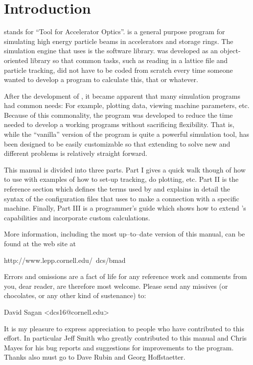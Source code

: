 \section*{Introduction}

\tao stands for ``Tool for Accelerator Optics''. \tao is a general
purpose program for simulating high energy particle beams in
accelerators and storage rings. The simulation engine that \tao uses
is the \bmad software library\cite{b:bmad}. \bmad was developed as an
object-oriented library so that common tasks, such as reading in a
lattice file and particle tracking, did not have to be coded from
scratch every time someone wanted to develop a program to calculate
this, that or whatever.

After the development of \bmad, it became apparent that many simulation
programs had common needs: For example, plotting data, viewing machine
parameters, etc. Because of this commonality, the \tao program was
developed to reduce the time needed to develop a working programs
without sacrificing flexibility. That is, while the ``vanilla''
version of the \tao program is quite a powerful simulation tool, \tao
has been designed to be easily customizable so that extending \tao to
solve new and different problems is relatively straight forward.

This manual is divided into three parts. Part I gives a quick
walk though of how to use \tao with examples of how to set-up tracking, 
do plotting, etc. Part II is the reference section 
which defines the
terms used by \tao and explains in detail the syntax of the
configuration files that \tao uses to make a connection with a
specific machine. Finally, Part III is a programmer's guide which
shows how to extend \tao's capabilities and incorporate custom
calculations.

More information, including the most up--to--date version of this
manual, can be found at the \bmad web site at
\begin{example}
  http://www.lepp.cornell.edu/~dcs/bmad
\end{example}

Errors and omissions are a fact of life for any reference work and
comments from you, dear reader, are therefore most welcome. Please
send any missives (or chocolates, or any other kind of sustenance) to:
\begin{example}
  David Sagan <dcs16@cornell.edu>
\end{example}

It is my pleasure to express appreciation to people who have
contributed to this effort. In particular Jeff Smith who greatly
contributed to this manual and Chris Mayes for his bug reports and
suggestions for improvements to the program. Thanks also must go to
Dave Rubin and Georg Hoffstaetter.
